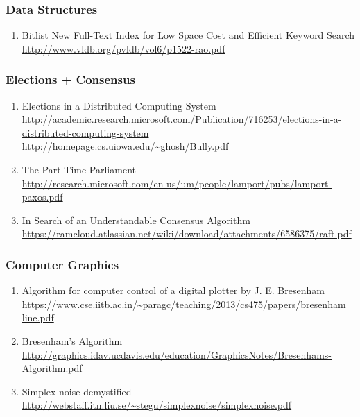 \documentclass{article}
\begin{document}
\subsubsection{Data Structures}
\begin{enumerate}
\item {Bitlist New Full-Text Index for Low Space Cost and Efficient Keyword Search\\
\url{http://www.vldb.org/pvldb/vol6/p1522-rao.pdf}}
\end{enumerate}

\subsubsection{Elections + Consensus}

\begin{enumerate}
	\item {Elections in a Distributed Computing System\\
\href{http://academic.research.microsoft.com/Publication/716253/elections-in-a-distributed-computing-system}{http://academic.research.microsoft.com/Publication/716253/elections-in-a-distributed-computing-system}\\
\url{http://homepage.cs.uiowa.edu/~ghosh/Bully.pdf}}
	\item {The Part-Time Parliament\\
\href{http://research.microsoft.com/en-us/um/people/lamport/pubs/lamport-paxos.pdf}{http://research.microsoft.com/en-us/um/people/lamport/pubs/lamport-paxos.pdf}}
	\item {In Search of an Understandable Consensus Algorithm\\
\href{https://ramcloud.atlassian.net/wiki/download/attachments/6586375/raft.pdf}{https://ramcloud.atlassian.net/wiki/download/attachments/6586375/raft.pdf}}
\end{enumerate}

\subsubsection{Computer Graphics}
\begin{enumerate}
	\item {Algorithm for computer control of a digital plotter by J. E. Bresenham\\\url{https://www.cse.iitb.ac.in/~paragc/teaching/2013/cs475/papers/bresenham_line.pdf}}
	\item {Bresenham's Algorithm\\
\url{http://graphics.idav.ucdavis.edu/education/GraphicsNotes/Bresenhams-Algorithm.pdf}}
	\item {Simplex noise demystified\\\url{http://webstaff.itn.liu.se/~stegu/simplexnoise/simplexnoise.pdf}}
\end{enumerate}
\end{document}
